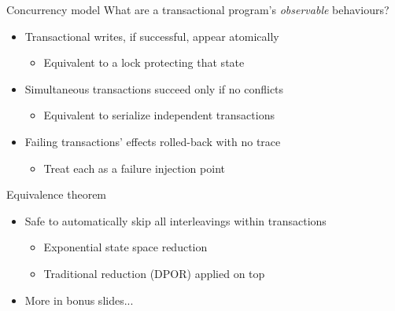 \documentclass[xcolor=dvipsnames]{beamer}
\begin{document}
\begin{frame}{Concurrency model}
	What are a transactional program's {\em observable} behaviours?
	\begin{itemize}
		\item Transactional writes, if successful, appear atomically %
		\begin{itemize}
			\item Equivalent to a lock protecting that state
		\end{itemize}
			\pause
		\item Simultaneous transactions succeed only if no conflicts
		\begin{itemize}
			\item Equivalent
				to serialize independent transactions
		\end{itemize}
			\pause
		\item Failing transactions' effects rolled-back with no trace
		\begin{itemize}
			\item Treat each \xbegin as a failure injection point
		\end{itemize}
	\end{itemize}
	\pause
	\linegap

	Equivalence theorem
	\begin{itemize}
		\item Safe to automatically skip all interleavings within transactions %
			\begin{itemize}
				\item Exponential state space reduction
				\item Traditional reduction (DPOR) applied on top
			\end{itemize}
		\item More in bonus slides...
	\end{itemize}
\end{frame}
\end{document}
